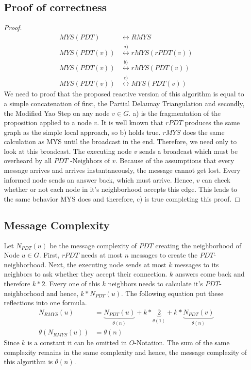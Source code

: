 \subsection{Proof of correctness}
\begin{proof}
\begin{equation*}
\begin{split}
	MYS(PDT) &\leftrightarrow RMYS\\
	MYS(PDT(v)) &\stackrel{a)}{\leftrightarrow} rMYS(rPDT(v)) \\
    MYS(PDT(v)) &\stackrel{b)}{\leftrightarrow} rMYS(PDT(v))\\
    MYS(PDT(v)) &\stackrel{c)}{\leftrightarrow} MYS(PDT(v)) 
\end{split}
\end{equation*}
We need to proof that the proposed reactive version of this algorithm is equal to a simple concatenation of first, the Partial Delaunay Triangulation and secondly, the Modified Yao Step on any node $v \in G$.
a) is the fragmentation of the proposition applied to a node $v $.
It is well known that $rPDT $ produces the same graph as the simple local approach, so b) holds true.
$rMYS $ does the same calculation as MYS until the broadcast in the end.
Therefore, we need only to look at this broadcast.
The executing node $v $ sends a broadcast which must be overheard by all $PDT $ -Neighbors of $v $.
Because of the assumptions that every message arrives and arrives instantaneously, the message cannot get lost.
Every informed node sends an answer back, which must arrive.
Hence, $v $ can check whether or not each node in it's neighborhood accepts this edge.
This leads to the same behavior MYS does and therefore, c) is true completing this proof.
\end{proof}

\subsection{Message Complexity}
\label{message_complexity}
Let $N_{PDT}(u) $ be the message complexity of $PDT $ creating the neighborhood of Node $u \in G$.
First, $rPDT $ needs at most $n $ messages to create the $PDT $-neighborhood.
Next, the executing node sends at most $k $ messages to its neighbors to ask whether they accept their connection.
$k $ answers come back and therefore $k * 2 $.
Every one of this $k $ neighbors needs to calculate it's $PDT $-neighborhood and hence, $k*N_{PDT}(u) $.
The following equation put these reflections into one formula.
\begin{equation*}
\begin{split}
N_{RMYS}(u) &= \underbrace{N_{PDT}(u)}_{\theta (n)} +k *\underbrace{2}_{\theta (1)} + k*\underbrace{N_{PDT}(v)}_{\theta (n)} \\
\theta (N_{RMYS}(u)) &= \theta (n) 
\end{split}
\end{equation*}
Since $k $ is a constant it can be omitted in $O $-Notation.
The sum of the same complexity remains in the same complexity and hence, the message complexity of this algorithm is $\theta (n) $.

